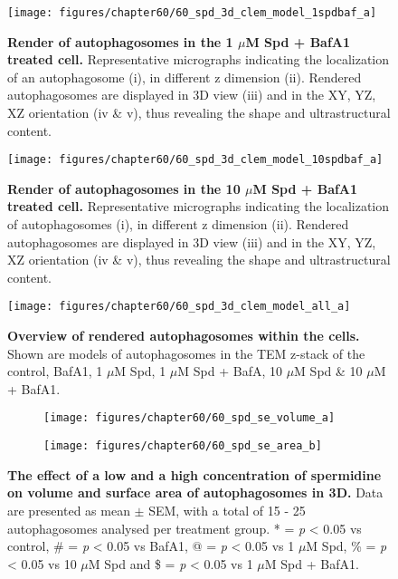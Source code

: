 \begin{figure}[!htbp]
\center
 \texttt{[image: figures/chapter60/60\_spd\_3d\_clem\_model\_1spdbaf\_a]}
 \caption[Render of autophagosomes in the 1 $\mu$M Spd + BafA1 treated cell]{\textbf{Render of autophagosomes in the 1 $\mu$M Spd + BafA1 treated cell.} Representative micrographs indicating the localization of an autophagosome (i), in different z dimension (ii). Rendered autophagosomes are displayed in 3D view (iii) and in the XY, YZ, XZ orientation (iv \& v), thus revealing the shape and ultrastructural content.}
 \label{fig:60_spd_3d_clem_model_1spdbaf_a}
\end{figure} 

\begin{figure}[!htbp]
\center
 \texttt{[image: figures/chapter60/60\_spd\_3d\_clem\_model\_10spdbaf\_a]}
 \caption[Render of autophagosomes in the 10 $\mu$M Spd + BafA1 treated cell]{\textbf{Render of autophagosomes in the 10 $\mu$M Spd + BafA1 treated cell.} Representative micrographs indicating the localization of autophagosomes (i), in different z dimension (ii). Rendered autophagosomes are displayed in 3D view (iii) and in the XY, YZ, XZ orientation (iv \& v), thus revealing the shape and ultrastructural content.}
 \label{fig:60_spd_3d_clem_model_10spdbaf_a}
\end{figure} 

\begin{landscape}
\begin{figure}[!htbp]
\center
 \texttt{[image: figures/chapter60/60\_spd\_3d\_clem\_model\_all\_a]}
 \caption[Overview of rendered autophagosomes within the cells]{\textbf{Overview of rendered autophagosomes within the cells.} Shown are models of autophagosomes in the TEM z-stack of the control, BafA1, 1 $\mu$M Spd, 1 $\mu$M Spd + BafA, 10 $\mu$M Spd \& 10 $\mu$M + BafA1.}
 \label{fig:60_spd_3d_clem_model_all_a}
\end{figure} 
\end{landscape}

\begin{figure}[!htbp]
 \begin{subfigure}[b]{0.495\linewidth}
  \texttt{[image: figures/chapter60/60\_spd\_se\_volume\_a]}
 \end{subfigure}
 \begin{subfigure}[b]{0.495\linewidth}
  \texttt{[image: figures/chapter60/60\_spd\_se\_area\_b]}
 \end{subfigure}
  \caption[The effect of a low and a high concentration of spermidine on volume and surface area of autophagosomes in 3D]{\textbf{The effect of a low and a high concentration of spermidine on volume and surface area of autophagosomes in 3D.} Data are presented as mean $\pm$ SEM, with a total of 15 - 25 autophagosomes analysed per treatment group. * = \textit{p} < 0.05 vs control, \# = \textit{p} < 0.05 vs BafA1, @ = \textit{p} < 0.05 vs 1 $\mu$M Spd, \% = \textit{p} < 0.05 vs 10 $\mu$M Spd and \$ = \textit{p} < 0.05 vs 1 $\mu$M Spd + BafA1.}
 \label{fig:60_spd_se_volume_a}
\end{figure}

